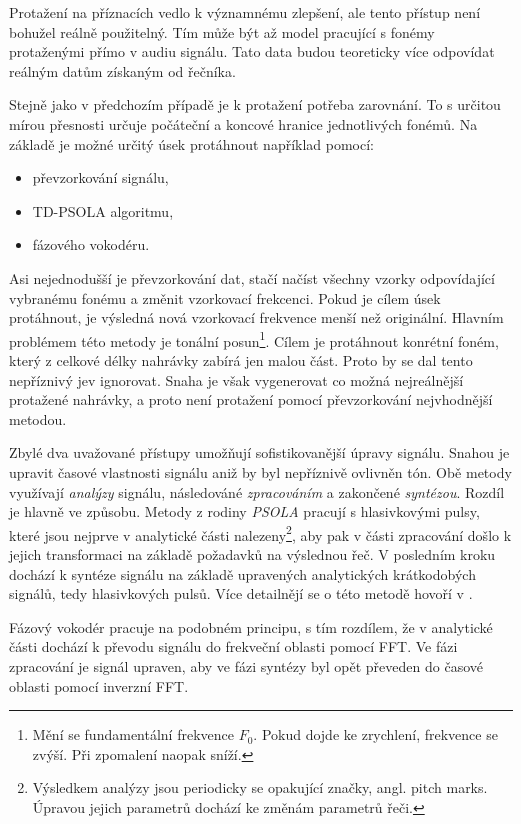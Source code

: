 Protažení na příznacích vedlo k významnému zlepšení, ale tento přístup není bohužel reálně použitelný. Tím může být až model pracující s fonémy protaženými přímo v audiu signálu. Tato data budou teoreticky více odpovídat reálným datům získaným od řečníka.

Stejně jako v předchozím případě je k protažení potřeba zarovnání. To s určitou mírou přesnosti určuje počáteční a koncové hranice jednotlivých fonémů. Na základě je možné určitý úsek protáhnout například pomocí:

\begin{itemize}
  \item převzorkování signálu,
  \item TD-PSOLA algoritmu,
  \item fázového vokodéru.
\end{itemize}

\noindent Asi nejednodušší je převzorkování dat, stačí načíst všechny vzorky odpovídající vybranému fonému a změnit vzorkovací frekcenci. Pokud je cílem úsek protáhnout, je výsledná nová vzorkovací frekvence menší než originální. Hlavním problémem této metody je tonální posun\footnote{Mění se fundamentální frekvence $F_0$. Pokud dojde ke zrychlení, frekvence se zvýší. Při zpomalení naopak sníží.}. Cílem je protáhnout konrétní foném, který z celkové délky nahrávky zabírá jen malou část. Proto by se dal tento nepříznivý jev ignorovat. Snaha je však vygenerovat co možná nejreálnější protažené nahrávky, a proto není protažení pomocí převzorkování nejvhodnější metodou.

Zbylé dva uvažované přístupy umožňují sofistikovanější úpravy signálu. Snahou je upravit časové vlastnosti signálu aniž by byl nepříznivě ovlivněn tón.  Obě metody využívají \textit{analýzy} signálu,  následováné \textit{zpracováním} a zakončené \textit{syntézou}. Rozdíl je hlavně ve způsobu. Metody z rodiny \textit{PSOLA} pracují s hlasivkovými pulsy, které jsou nejprve v analytické části nalezeny\footnote{Výsledkem analýzy jsou periodicky se opakující značky, angl. pitch marks. Úpravou jejich parametrů dochází ke změnám parametrů řeči.}, aby pak v části zpracování došlo k jejich transformaci na základě požadavků na výslednou řeč. V posledním kroku dochází k syntéze signálu na základě upravených analytických krátkodobých signálů, tedy hlasivkových pulsů. Více detailnějí se o této metodě hovoří v \cite{Psutka2006}.

Fázový vokodér pracuje na podobném principu, s tím rozdílem, že v analytické části dochází k převodu signálu do frekveční oblasti pomocí FFT. Ve fázi zpracování je signál upraven, aby ve fázi syntézy byl opět převeden do časové oblasti pomocí inverzní FFT.

